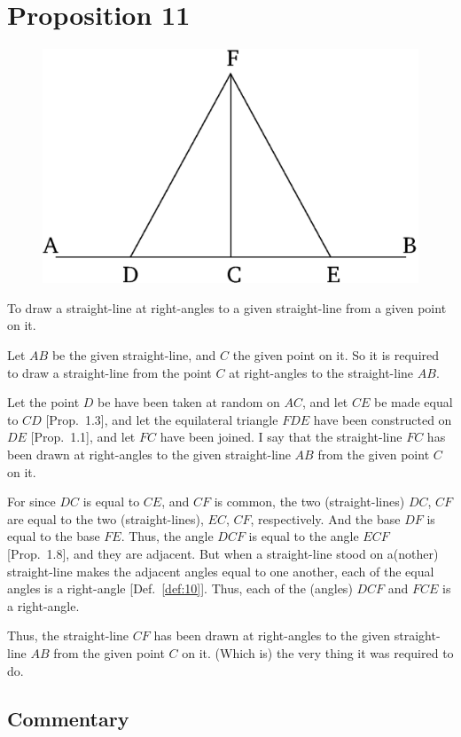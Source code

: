 \chapter*{Proposition 11}
\label{prop:11}


\begin{figure}[ht]
    \begin{center}
    \includegraphics[width=0.5\linewidth]{figures/fig11e.eps}
    \label{fig:prop_11}
    \end{center}
\end{figure}

To draw a straight-line at right-angles to a given straight-line from a given point on it.

Let $AB$ be the given straight-line, and $C$ the given point on it. So it is required
to draw a straight-line from the point $C$ at right-angles to the straight-line $AB$.

Let the point $D$ be have been taken at random on $AC$, and let $CE$ be made equal to $CD$ [Prop.~1.3], and let the equilateral triangle $FDE$
have been constructed on $DE$ [Prop.~1.1], and let $FC$ have been
joined. I say that the straight-line $FC$ has been drawn at right-angles
to the given straight-line $AB$ from the given point $C$ on it.

For since $DC$ is equal to $CE$, and $CF$ is common, the two (straight-lines) $DC$, $CF$
are equal to the two (straight-lines), $EC$, $CF$, respectively.  And the base $DF$
is equal to the base $FE$. Thus, the angle $DCF$ is equal to the
angle $ECF$ [Prop.~1.8], and they are adjacent. But when a straight-line stood on 
a(nother) straight-line makes the adjacent angles equal to one another, each of the
equal angles is a right-angle [Def.~\ref{def:10}]. Thus, each of the (angles)
$DCF$ and $FCE$ is a right-angle.

Thus, the straight-line $CF$ has been drawn at right-angles to the
given straight-line $AB$ from the given point $C$ on it. (Which is) the very thing
it was required to do.


\section*{Commentary}

